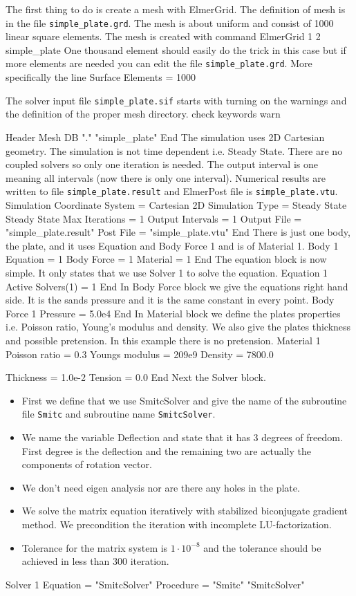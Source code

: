 The first thing to do is create a mesh with ElmerGrid.
The definition of mesh is in the file \texttt{simple\_plate.grd}.
The mesh is about uniform and consist of 1000 linear square elements.
The mesh is created with command
\ttbegin
ElmerGrid 1 2 simple_plate
\ttend
One thousand element should easily do the trick in this case
but if more elements are needed you can edit the file 
\texttt{simple\_plate.grd}.
More specifically the line
\ttbegin
Surface Elements = 1000
\ttend

The solver input file \texttt{simple\_plate.sif} starts with turning on 
the warnings and the definition of the proper mesh directory. 
%
\ttbegin
check keywords warn

Header
  Mesh DB "." "simple_plate"
End
\ttend
The simulation uses 2D Cartesian geometry. The simulation is not
time dependent i.e. Steady State. 
There are no coupled solvers so only one iteration is needed. 
The output interval is one meaning all intervals (now there is only one
interval). Numerical results are written to file \texttt{simple\_plate.result}
and ElmerPost file is \texttt{simple\_plate.vtu}.
\ttbegin
Simulation
  Coordinate System = Cartesian 2D
  Simulation Type = Steady State
  Steady State Max Iterations = 1
  Output Intervals = 1
  Output File = "simple_plate.result"
  Post File = "simple_plate.vtu"
End
\ttend
There is just one body, the plate, and it uses Equation and  Body Force 1 and
is of Material 1.
\ttbegin
Body 1
  Equation = 1
  Body Force = 1
  Material = 1
End
\ttend
The equation block is now simple. 
It only states that we use Solver 1 to solve the equation.
\ttbegin
Equation 1
  Active Solvers(1) = 1
End
\ttend
In Body Force block we give the equations right hand side. 
It is the sands pressure and it is the same constant in every point.
\ttbegin
Body Force 1
  Pressure = 5.0e4
End
\ttend
In Material block we define the plates properties i.e. Poisson ratio,
Young's modulus and density. We also give the plates thickness and
possible pretension. In this example there is no pretension.
\ttbegin
Material 1   
  Poisson ratio = 0.3
  Youngs modulus = 209e9
  Density = 7800.0

  Thickness = 1.0e-2
  Tension = 0.0
End
\ttend
Next the Solver block.
\begin{itemize}
\item First we define that we use SmitcSolver  
and give the name of the subroutine file \texttt{Smitc} and
subroutine name \texttt{SmitcSolver}. 
\item We name the variable Deflection and state that it has 3 degrees of freedom. 
First degree is the deflection and the remaining two are actually 
the components of rotation vector. 
\item We don't need eigen analysis nor are there any holes in the plate. 
\item We solve the matrix equation iteratively with stabilized biconjugate 
gradient method. We precondition the iteration with incomplete 
LU-factorization. 
\item Tolerance for the matrix system is $1\cdot10^{-8}$
and the tolerance should be achieved in less than 300 iteration.
\end{itemize}
\ttbegin
Solver 1
  Equation = "SmitcSolver"
  Procedure = "Smitc" "SmitcSolver"

